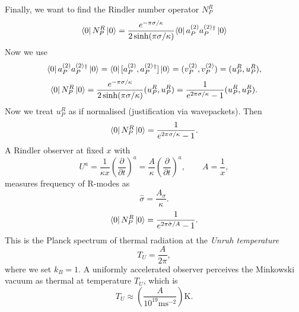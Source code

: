 Finally, we want to find the Rindler number operator $N_P^R$
\begin{equation}
  \bra{0} N_P^R \ket{0} = \frac{e^{- \pi \sigma / \kappa}}{2 \sinh (\pi \sigma / \kappa)} {\bra{0} a_P^{(2)} a_{P}^{(2)}{}^{\dagger}} \ket{0}
\end{equation}
Now we use
\begin{equation}
  \bra{0} a_P^{(2)} a_{P}^{(2)}{}^{\dagger} \ket{0} = \bra{0} [a_P^{(2)}, a_{P}^{(2)}{}^{\dagger} ] \ket{0} = (v_P^{(2)}, v_P^{(2)}) = (u_P^R, u_P^R),
\end{equation}
\begin{equation}
  \bra{0} N_P^R \ket{0} = \frac{e^{-\pi \sigma / \kappa}}{2 \sinh (\pi \sigma / \kappa)} (u_P^R, u_P^R) = \frac{1}{e^{2 \pi \sigma / \kappa} - 1} (u_P^R, u_P^R).
\end{equation}
Now we treat $u_P^R$ as if normalised (justification via wavepackets). Then
\begin{equation}
  \bra{0} N_P^R \ket{0} = \frac{1}{e^{2 \pi \sigma / \kappa} - 1}.
\end{equation}
A Rindler observer at fixed $x$ with
\begin{equation}
  U^{a} = \frac{1}{\kappa x} \left( \frac{\partial }{\partial t} \right)^{a} = \frac{A}{\kappa} \left( \frac{\partial }{\partial t} \right)^{a}, \qquad A = \frac{1}{x},
\end{equation}
measures frequency of R-modes as 
\begin{equation}
  \hat{\sigma} = \frac{A_{\sigma}}{\kappa}.
\end{equation}
\begin{equation}
  \bra{0} N_P^R \ket{0} = \frac{1}{e^{2 \pi \hat{\sigma} / A} - 1}.
\end{equation}
This is the Planck spectrum of thermal radiation at the \emph{Unruh temperature}
\begin{equation}
  T_U = \frac{A}{2 \pi},
\end{equation}
where we set $k_B = 1$.
A uniformly accelerated observer perceives the Minkowski vacuum as thermal at temperature $T_U$, which is
\begin{equation}
  T_U \approx \left( \frac{A}{10^{19} \text{ms}^{-2}} \right) \text{K}.
\end{equation}
